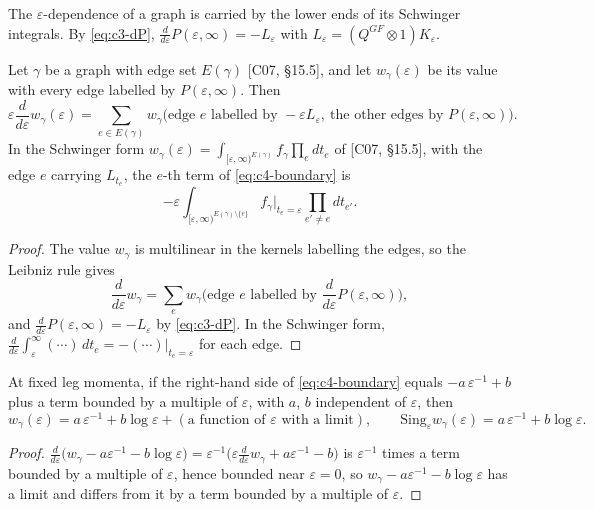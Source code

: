 The $\varepsilon$-dependence of a graph is carried by the lower ends of its Schwinger integrals. By \eqref{eq:c3-dP}, $\frac{d}{d\varepsilon}P(\varepsilon,\infty)=-L_\varepsilon$ with $L_\varepsilon=(Q^{GF}\otimes1)K_\varepsilon$.

\begin{proposition}
\label{prop:c4-boundary}
Let $\gamma$ be a graph with edge set $E(\gamma)$ [C07, §15.5], and let $w_\gamma(\varepsilon)$ be its value with every edge labelled by $P(\varepsilon,\infty)$. Then
\begin{equation}
\varepsilon\frac{d}{d\varepsilon}w_\gamma(\varepsilon)=\sum_{e\in E(\gamma)}w_\gamma\big(\text{edge }e\text{ labelled by }-\varepsilon L_\varepsilon,\ \text{the other edges by }P(\varepsilon,\infty)\big).
\label{eq:c4-boundary}
\end{equation}
In the Schwinger form $w_\gamma(\varepsilon)=\int_{[\varepsilon,\infty)^{E(\gamma)}}f_\gamma\prod_{e}dt_e$ of [C07, §15.5], with the edge $e$ carrying $L_{t_e}$, the $e$-th term of \eqref{eq:c4-boundary} is
\[
-\varepsilon\int_{[\varepsilon,\infty)^{E(\gamma)\setminus\{e\}}}f_\gamma\big|_{t_e=\varepsilon}\prod_{e'\neq e}dt_{e'} .
\]
\end{proposition}

\begin{proof}
The value $w_\gamma$ is multilinear in the kernels labelling the edges, so the Leibniz rule gives
\[
\frac{d}{d\varepsilon}w_\gamma=\sum_e w_\gamma\Big(\text{edge }e\text{ labelled by }\frac{d}{d\varepsilon}P(\varepsilon,\infty)\Big),
\]
and $\frac{d}{d\varepsilon}P(\varepsilon,\infty)=-L_\varepsilon$ by \eqref{eq:c3-dP}. In the Schwinger form, $\frac{d}{d\varepsilon}\int_\varepsilon^\infty(\cdots)\,dt_e=-(\cdots)|_{t_e=\varepsilon}$ for each edge.
\end{proof}

\begin{corollary}
\label{cor:c4-sing}
At fixed leg momenta, if the right-hand side of \eqref{eq:c4-boundary} equals $-a\,\varepsilon^{-1}+b$ plus a term bounded by a multiple of $\varepsilon$, with $a$, $b$ independent of $\varepsilon$, then
\[
w_\gamma(\varepsilon)=a\,\varepsilon^{-1}+b\log\varepsilon+(\text{a function of }\varepsilon\text{ with a limit}),\qquad \mathrm{Sing}_\varepsilon w_\gamma(\varepsilon)=a\,\varepsilon^{-1}+b\log\varepsilon .
\]
\end{corollary}

\begin{proof}
$\frac{d}{d\varepsilon}\big(w_\gamma-a\varepsilon^{-1}-b\log\varepsilon\big)=\varepsilon^{-1}\big(\varepsilon\frac{d}{d\varepsilon}w_\gamma+a\varepsilon^{-1}-b\big)$ is $\varepsilon^{-1}$ times a term bounded by a multiple of $\varepsilon$, hence bounded near $\varepsilon=0$, so $w_\gamma-a\varepsilon^{-1}-b\log\varepsilon$ has a limit and differs from it by a term bounded by a multiple of $\varepsilon$.
\end{proof}

